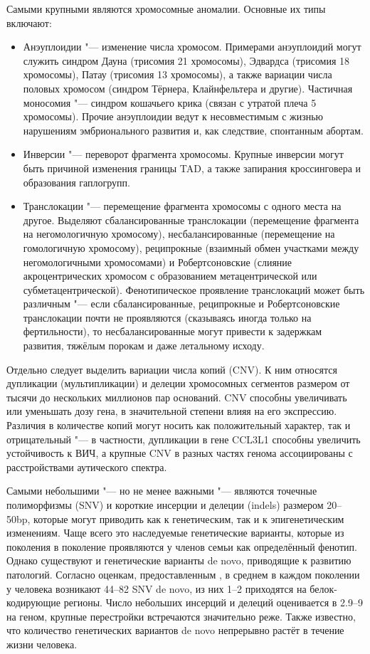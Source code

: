 \documentclass[a4paper,12pt]{article}
\begin{document}
Самыми крупными являются хромосомные аномалии.
Основные их типы включают:
\begin{itemize}
\item Анэуплоидии "--- изменение числа хромосом.
Примерами анэуплоидий могут служить синдром Дауна (трисомия 21 хромосомы), Эдвардса (трисомия 18 хромосомы), Патау (трисомия 13 хромосомы), а также вариации числа половых хромосом (синдром Тёрнера, Клайнфельтера и другие).
Частичная моносомия "--- синдром кошачьего крика (связан с утратой плеча 5 хромосомы).
Прочие анэуплоидии ведут к несовместимым с жизнью нарушениям эмбрионального развития и, как следствие, спонтанным абортам.
\item Инверсии "--- переворот фрагмента хромосомы.
Крупные инверсии могут быть причиной изменения границы TAD, а также запирания кроссинговера и образования гаплогрупп.
\item Транслокации "--- перемещение фрагмента хромосомы с одного места на другое.
Выделяют сбалансированные транслокации (перемещение фрагмента на негомологичную хромосому), несбалансированные (перемещение на гомологичную хромосому), реципрокные (взаимный обмен участками между негомологичными хромосомами) и Робертсоновские (слияние акроцентрических хромосом с образованием метацентрической или субметацентрической).
Фенотипическое проявление транслокаций может быть различным "--- если сбалансированные, реципрокные и Робертсоновские транслокации почти не проявляются (сказываясь иногда только на фертильности), то несбалансированные могут привести к задержкам развития, тяжёлым порокам и даже летальному исходу.
\end{itemize}

Отдельно следует выделить вариации числа копий (CNV).
К ним относятся дупликации (мультипликации) и делеции хромосомных сегментов размером от тысячи до нескольких миллионов пар оснований.
CNV способны увеличивать или уменьшать дозу гена, в значительной степени влияя на его экспрессию.
Различия в количестве копий могут носить как положительный характер, так и отрицательный "--- в частности, дупликации в гене CCL3L1 способны увеличить устойчивость к ВИЧ\cite{gonzalez}, а крупные CNV в разных частях генома ассоциированы с расстройствами аутического спектра\cite{sebat}.

Самыми небольшими "--- но не менее важными "--- являются точечные полиморфизмы (SNV) и короткие инсерции и делеции (indels) размером 20--50bp, которые могут приводить как к генетическим, так и к эпигенетическим изменениям.
Чаще всего это наследуемые генетические варианты, которые из поколения в поколение проявляются у членов семьи как определённый фенотип.
Однако существуют и генетические варианты de novo, приводящие к развитию патологий.
Согласно оценкам, предоставленным \cite{acuna-higaldo}, в среднем в каждом поколении у человека возникают 44--82 SNV de novo, из них 1--2 приходятся на белок-кодирующие регионы.
Число небольших инсерций и делеций оценивается в 2.9--9 на геном, крупные перестройки встречаются значительно реже.
Также известно, что количество генетических вариантов de novo непрерывно растёт в течение жизни человека.
\end{document}
